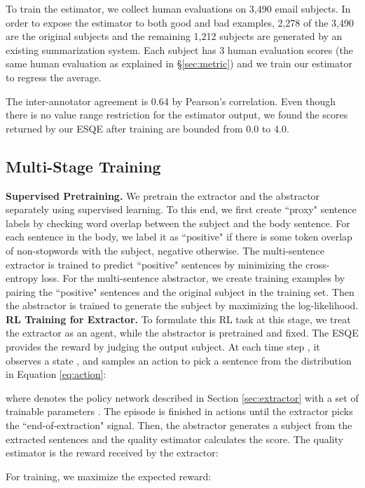 \documentclass[11pt,a4paper]{article}
\newcommand{\esqe}{{\sc ESQE}\xspace}
\begin{document}
To train the estimator, we collect human evaluations on 3,490 email subjects.  
In order to expose the estimator to both good and bad examples, 2,278 of the 3,490 are the original subjects and the remaining 1,212 subjects are generated by an existing summarization system.
Each subject has 3 human evaluation scores (the same human evaluation as explained in \S\ref{sec:metric}) and we train our estimator to regress the average.

The inter-annotator agreement is 0.64 by Pearson's  correlation.
Even though there is no value range restriction for the estimator output, we found the scores returned by our \esqe after training are bounded from 0.0 to 4.0.

\subsection{Multi-Stage Training}
\label{sec:training}
\textbf{Supervised Pretraining.} 
We pretrain the extractor and the abstractor separately using supervised learning.
To this end, we first create ``proxy" sentence labels by checking word overlap between the subject and the body sentence.
For each sentence in the body, we label it as ``positive" if there is some token overlap of non-stopwords with the subject, negative otherwise.
The multi-sentence extractor is trained to predict ``positive" sentences by minimizing the cross-entropy loss.
For the multi-sentence abstractor, we create training examples by pairing the ``positive" sentences and the original subject in the training set.
Then the abstractor is trained to generate the subject by maximizing the log-likelihood.
\\\noindent
\textbf{RL Training for Extractor.}
To formulate this RL task at this stage, we treat the extractor as an agent, while the abstractor is pretrained and fixed.
The \esqe provides the reward by judging the output subject.
At each time step , it observes a state , and samples an action  to pick a sentence from the distribution in Equation \ref{eq:action}:

where  denotes the policy network described in Section \ref{sec:extractor} with a set of trainable parameters .
The episode is finished in  actions until the extractor picks the ``end-of-extraction" signal.
Then, the abstractor generates a subject from the extracted sentences and the quality estimator calculates the score.
The quality estimator is the reward received by the extractor:

For training, we maximize the expected reward:
\end{document}
